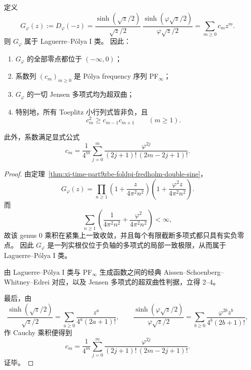 \begin{theorem}\label{thm:xi-time-part9zbj-lp-pf-rigidity}
定义
\[
G_\varphi(z):=D_\varphi(-z)
=
\frac{\sinh(\sqrt z/2)}{\sqrt z/2}
\,
\frac{\sinh(\varphi\sqrt z/2)}{\varphi\sqrt z/2}
=
\sum_{m\ge 0}c_m z^m.
\]
则 \(G_\varphi\) 属于 Laguerre--P\'olya I 类。
因此：
\begin{enumerate}
  \item \(G_\varphi\) 的全部零点都位于 \((-\infty,0)\)；
  \item 系数列 \((c_m)_{m\ge 0}\) 是 P\'olya frequency 序列 PF\(_\infty\)；
  \item \(G_\varphi\) 的一切 Jensen 多项式均为超双曲；
  \item 特别地，所有 Toeplitz 小行列式皆非负，且
  \[
  c_m^2\ge c_{m-1}c_{m+1}
  \qquad (m\ge 1).
  \]
\end{enumerate}
此外，系数满足显式公式
\[
c_m
=
\frac{1}{4^m}
\sum_{j=0}^{m}
\frac{\varphi^{2j}}
{(2j+1)!\,(2m-2j+1)!}.
\]
\end{theorem}
\begin{proof}
由定理~\ref{thm:xi-time-part9zbe-foldpi-fredholm-double-sine}，
\[
G_\varphi(z)
=
\prod_{n\ge 1}
\left(1+\frac{z}{4\pi^2n^2}\right)
\left(1+\frac{\varphi^2 z}{4\pi^2n^2}\right).
\]
而
\[
\sum_{n\ge 1}
\left(
\frac{1}{4\pi^2n^2}
+
\frac{\varphi^2}{4\pi^2n^2}
\right)
<\infty,
\]
故该 genus \(0\) 乘积在紧集上一致收敛，并且每个有限截断多项式都只具有实负零点。
因此 \(G_\varphi\) 是一列实根仅位于负轴的多项式的局部一致极限，从而属于 Laguerre--P\'olya I 类。

由 Laguerre--P\'olya I 类与 PF\(_\infty\) 生成函数之间的经典 Aissen--Schoenberg--Whitney--Edrei 对应，以及 Jensen 多项式的超双曲性判据，立得 2--4。

最后，由
\[
\frac{\sinh(\sqrt z/2)}{\sqrt z/2}
=
\sum_{a\ge 0}\frac{z^a}{4^a(2a+1)!},
\qquad
\frac{\sinh(\varphi\sqrt z/2)}{\varphi\sqrt z/2}
=
\sum_{b\ge 0}\frac{\varphi^{2b}z^b}{4^b(2b+1)!},
\]
作 Cauchy 乘积便得到
\[
c_m
=
\frac{1}{4^m}
\sum_{j=0}^{m}
\frac{\varphi^{2j}}
{(2j+1)!\,(2m-2j+1)!}.
\]
证毕。
\end{proof}

